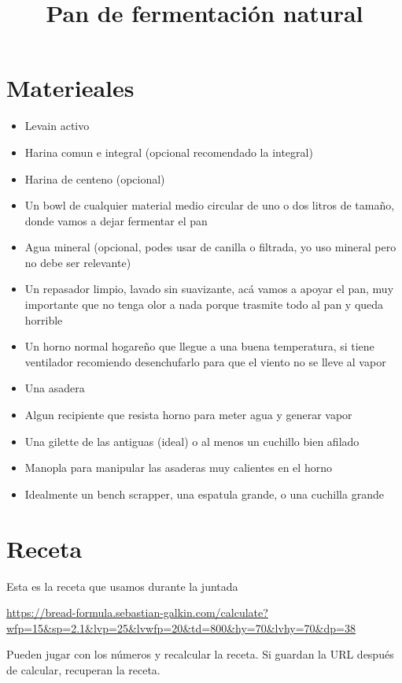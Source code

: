 \documentclass[10pt,a4paper]{article}
\title{Pan de fermentación natural}
\begin{document}
\maketitle
\tableofcontents

\section{Materieales}

\begin{itemize}
\item Levain activo
\item  Harina comun e integral (opcional recomendado la integral)
\item  Harina de centeno (opcional)
\item  Un bowl de cualquier material medio circular de uno o dos litros de tamaño, donde vamos a dejar fermentar el pan
\item  Agua mineral (opcional, podes usar de canilla o filtrada, yo uso mineral pero no debe ser relevante)
\item  Un repasador limpio, lavado sin suavizante, acá vamos a apoyar el pan, muy importante que no tenga olor a nada porque trasmite todo al pan y queda horrible
\item  Un horno normal hogareño que llegue a una buena temperatura, si tiene ventilador recomiendo desenchufarlo para que el viento no se lleve al vapor
\item  Una asadera
\item  Algun recipiente que resista horno para meter agua y generar vapor
\item  Una gilette de las antiguas (ideal) o al menos un cuchillo bien afilado
\item  Manopla para manipular las asaderas muy calientes en el horno
\item  Idealmente un bench scrapper, una espatula grande, o una cuchilla grande
\end{itemize}

\section{Receta}
Esta es la receta que usamos durante la juntada

\url{https://bread-formula.sebastian-galkin.com/calculate?wfp=15&sp=2.1&lvp=25&lvwfp=20&td=800&hy=70&lvhy=70&dp=38}

Pueden jugar con los números y recalcular la receta.  Si guardan la URL
después de calcular, recuperan la receta.
\end{document}
